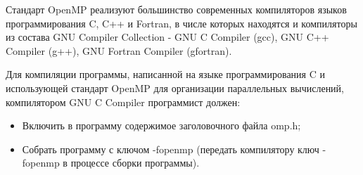 Стандарт OpenMP реализуют большинство современных компиляторов языков программирования C, C++ и Fortran, в числе которых находятся и компиляторы из состава GNU Compiler Collection - GNU C Compiler (gcc), GNU C++ Compiler (g++), GNU Fortran Compiler (gfortran).

Для компиляции программы, написанной на языке программирования C и использующей стандарт OpenMP для организации параллельных вычислений, компилятором GNU C Compiler программист должен:

\begin{itemize}

	\item Включить в программу содержимое заголовочного файла omp.h;
	\item Собрать программу с ключом -fopenmp (передать компилятору ключ -fopenmp в процессе сборки программы).

\end{itemize}

